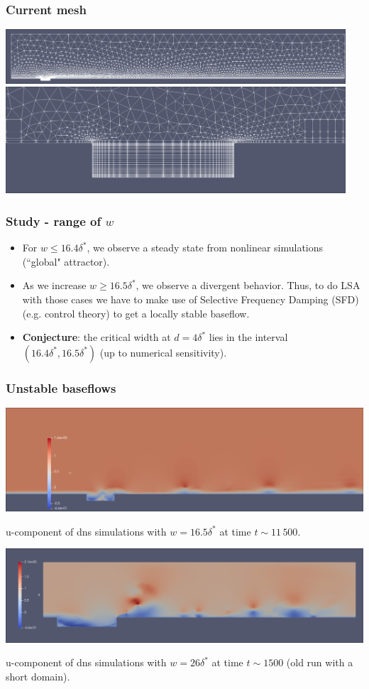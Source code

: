 \documentclass[
  aspectratio=169, %
  t, %
  onlytextwidth, %
  10pt, %
]{beamer}
\begin{document}
\begin{frame}
\frametitle{Current mesh}
{
  \includegraphics[width=0.95\textwidth]{Images/mesh_full.png}
  \includegraphics[width=0.95\textwidth]{Images/mesh_gap.png}
}

\end{frame}
\begin{frame}
  \frametitle{Study - range of $w$}
  \begin{itemize}
    \item For $w \leq 16.4\delta^*$, we observe a steady state from nonlinear simulations (``global" attractor).
    \item As we increase $w\geq 16.5\delta^*$, we observe a divergent behavior. Thus, to do LSA with those cases we have to make use of Selective Frequency Damping (SFD) (e.g. control theory) to get a locally stable baseflow.
    \item \textbf{Conjecture}: the critical width at $d=4\delta^*$ lies in the interval $(16.4\delta^*, 16.5\delta^*)$ (up to numerical sensitivity).
  \end{itemize}
\end{frame}
\begin{frame}
  \frametitle{Unstable baseflows}
  {
    \begin{center}
      \includegraphics[width=0.6\linewidth]{Images/dns16.5.png}

      u-component of dns simulations with $w = 16.5\delta^*$ at time $t \sim 11\,500$.

      \includegraphics[width=0.6\linewidth]{Images/dns26.png}

      u-component of dns simulations with $w = 26\delta^*$ at time $t \sim 1500$ (old run with a short domain).
    \end{center}

  } 
\end{frame}
\end{document}
